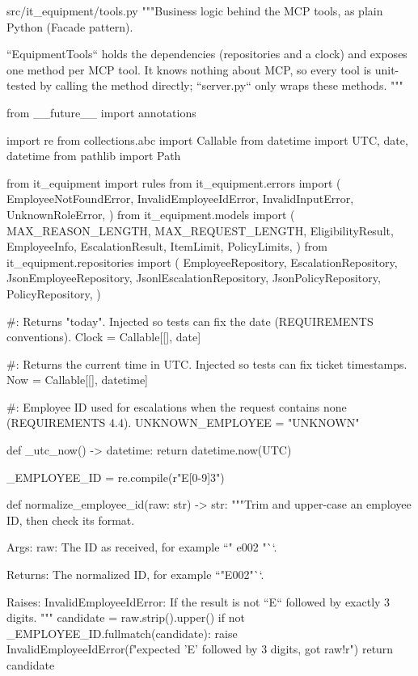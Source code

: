 \documentclass[11pt,letterpaper]{article}
\renewcommand{\_}{\textunderscore\allowbreak}
\begin{document}
\begin{codebox}{src/it_equipment/tools.py}
"""Business logic behind the MCP tools, as plain Python (Facade pattern).

``EquipmentTools`` holds the dependencies (repositories and a clock) and exposes one
method per MCP tool. It knows nothing about MCP, so every tool is unit-tested by calling
the method directly; ``server.py`` only wraps these methods.
"""

from __future__ import annotations

import re
from collections.abc import Callable
from datetime import UTC, date, datetime
from pathlib import Path

from it_equipment import rules
from it_equipment.errors import (
    EmployeeNotFoundError,
    InvalidEmployeeIdError,
    InvalidInputError,
    UnknownRoleError,
)
from it_equipment.models import (
    MAX_REASON_LENGTH,
    MAX_REQUEST_LENGTH,
    EligibilityResult,
    EmployeeInfo,
    EscalationResult,
    ItemLimit,
    PolicyLimits,
)
from it_equipment.repositories import (
    EmployeeRepository,
    EscalationRepository,
    JsonEmployeeRepository,
    JsonlEscalationRepository,
    JsonPolicyRepository,
    PolicyRepository,
)

#: Returns "today". Injected so tests can fix the date (REQUIREMENTS conventions).
Clock = Callable[[], date]

#: Returns the current time in UTC. Injected so tests can fix ticket timestamps.
Now = Callable[[], datetime]

#: Employee ID used for escalations when the request contains none (REQUIREMENTS 4.4).
UNKNOWN_EMPLOYEE = "UNKNOWN"


def _utc_now() -> datetime:
    return datetime.now(UTC)


_EMPLOYEE_ID = re.compile(r"E[0-9]{3}")


def normalize_employee_id(raw: str) -> str:
    """Trim and upper-case an employee ID, then check its format.

    Args:
        raw: The ID as received, for example ``" e002 "``.

    Returns:
        The normalized ID, for example ``"E002"``.

    Raises:
        InvalidEmployeeIdError: If the result is not ``E`` followed by exactly 3 digits.
    """
    candidate = raw.strip().upper()
    if not _EMPLOYEE_ID.fullmatch(candidate):
        raise InvalidEmployeeIdError(f"expected 'E' followed by 3 digits, got {raw!r}")
    return candidate



\end{codebox}
\end{document}
